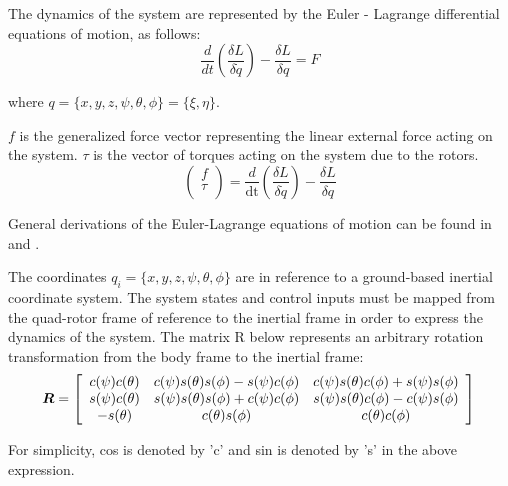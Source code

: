 \noindent The dynamics of the system are represented by the Euler - Lagrange differential equations of motion, as follows:
\begin{equation}
    \frac{d}{dt} \left( \frac{\delta  L} {\delta \dot{q}}\right) - \frac{\delta  L}{\delta q}=F
\end{equation}


where $ q = \{x,y,z,\psi ,\theta ,\phi \} = \{ \xi , \eta \}  $.


\noindent  $ f $ is the generalized force vector representing the linear external force acting on the system.
$\tau $ is the vector of torques acting on the system due to the rotors.
\begin{equation}
    \left( \begin{array}{c} f \\ \tau \\ \end{array} \right) = \frac{d}{\text{dt}} \left( \frac{\delta  L} {\delta \dot{q}}\right) - \frac{\delta  L}{\delta q}
\end{equation}

General derivations of the Euler-Lagrange equations of motion can be found in \cite{marion1995classical} and  \cite{cornelius1970variational}.

The coordinates  $ q_i=\{x,y,z,\psi ,\theta ,\phi \} $  are in reference to a ground-based inertial coordinate system. The system states and control inputs must be mapped from the quad-rotor frame of reference to the inertial frame in order to express the dynamics of the system. The matrix R below represents an arbitrary rotation transformation from the body frame to the inertial frame:
\begin{equation}
\boldsymbol R = \left[ \begin{array}{ccc}
c(\psi) c(\theta) & c(\psi) s(\theta) s(\phi) - s(\psi) c(\phi) & c(\psi) s(\theta) c(\phi) + s(\psi) s(\phi)\\
s(\psi) c(\theta) & s(\psi) s(\theta) s(\phi) + c(\psi) c(\phi) & s(\psi) s(\theta) c(\phi) - c(\psi) s(\phi)\\
-s(\theta) & c(\theta) s(\phi) & c(\theta) c(\phi)\\
\end{array} \right]\\
\end{equation}

For simplicity, cos is denoted by 'c' and sin is denoted by 's' in the above expression.





